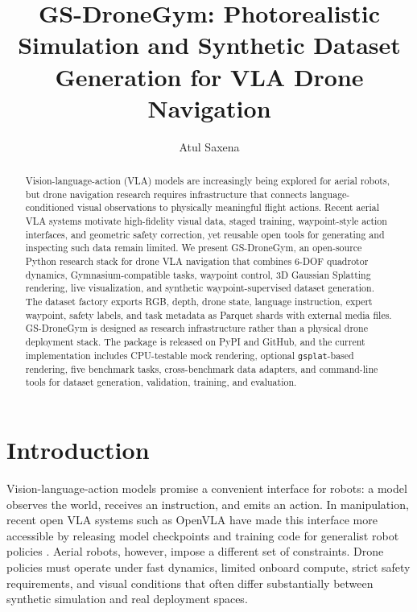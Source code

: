 \documentclass[11pt]{article}
\title{GS-DroneGym: Photorealistic Simulation and Synthetic Dataset Generation for VLA Drone Navigation}
\author{Atul Saxena}
\date{}
\begin{document}
\maketitle

\begin{abstract}
Vision-language-action (VLA) models are increasingly being explored for aerial robots, but drone navigation research requires infrastructure that connects language-conditioned visual observations to physically meaningful flight actions. Recent aerial VLA systems motivate high-fidelity visual data, staged training, waypoint-style action interfaces, and geometric safety correction, yet reusable open tools for generating and inspecting such data remain limited. We present GS-DroneGym, an open-source Python research stack for drone VLA navigation that combines 6-DOF quadrotor dynamics, Gymnasium-compatible tasks, waypoint control, 3D Gaussian Splatting rendering, live visualization, and synthetic waypoint-supervised dataset generation. The dataset factory exports RGB, depth, drone state, language instruction, expert waypoint, safety labels, and task metadata as Parquet shards with external media files. GS-DroneGym is designed as research infrastructure rather than a physical drone deployment stack. The package is released on PyPI and GitHub, and the current implementation includes CPU-testable mock rendering, optional \texttt{gsplat}-based rendering, five benchmark tasks, cross-benchmark data adapters, and command-line tools for dataset generation, validation, training, and evaluation.
\end{abstract}

\section{Introduction}

Vision-language-action models promise a convenient interface for robots: a model observes the world, receives an instruction, and emits an action. In manipulation, recent open VLA systems such as OpenVLA have made this interface more accessible by releasing model checkpoints and training code for generalist robot policies \cite{kim2024openvla}. Aerial robots, however, impose a different set of constraints. Drone policies must operate under fast dynamics, limited onboard compute, strict safety requirements, and visual conditions that often differ substantially between synthetic simulation and real deployment spaces.
\end{document}
